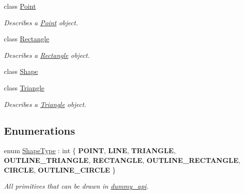 \begin{DoxyCompactItemize}
class \mbox{\hyperlink{classdummy__api_1_1Point}{Point}}
\begin{DoxyCompactList}\small\item\em Describes a \mbox{\hyperlink{classdummy__api_1_1Point}{Point}} object. \end{DoxyCompactList}\item 
class \mbox{\hyperlink{classdummy__api_1_1Rectangle}{Rectangle}}
\begin{DoxyCompactList}\small\item\em Describes a \mbox{\hyperlink{classdummy__api_1_1Rectangle}{Rectangle}} object. \end{DoxyCompactList}\item 
class \mbox{\hyperlink{classdummy__api_1_1Shape}{Shape}}
\item 
class \mbox{\hyperlink{classdummy__api_1_1Triangle}{Triangle}}
\begin{DoxyCompactList}\small\item\em Describes a \mbox{\hyperlink{classdummy__api_1_1Triangle}{Triangle}} object. \end{DoxyCompactList}\end{DoxyCompactItemize}
\subsection*{Enumerations}
\begin{DoxyCompactItemize}
\item 
\mbox{\label{namespacedummy__api_a7ca7e48af10aa1134221204c4f6b1042}} 
enum \mbox{\hyperlink{namespacedummy__api_a7ca7e48af10aa1134221204c4f6b1042}{Shape\+Type}} \+: int \{ \newline
{\bfseries P\+O\+I\+NT}, 
{\bfseries L\+I\+NE}, 
{\bfseries T\+R\+I\+A\+N\+G\+LE}, 
{\bfseries O\+U\+T\+L\+I\+N\+E\+\_\+\+T\+R\+I\+A\+N\+G\+LE}, 
\newline
{\bfseries R\+E\+C\+T\+A\+N\+G\+LE}, 
{\bfseries O\+U\+T\+L\+I\+N\+E\+\_\+\+R\+E\+C\+T\+A\+N\+G\+LE}, 
{\bfseries C\+I\+R\+C\+LE}, 
{\bfseries O\+U\+T\+L\+I\+N\+E\+\_\+\+C\+I\+R\+C\+LE}
 \}
\begin{DoxyCompactList}\small\item\em All primitives that can be drawn in \mbox{\hyperlink{namespacedummy__api}{dummy\+\_\+api}}. \end{DoxyCompactList}\end{DoxyCompactItemize}
